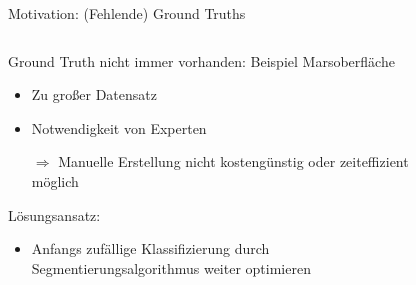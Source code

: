 \documentclass[9pt]{beamer}
\begin{document}
\begin{frame}{Motivation: (Fehlende) Ground Truths}
\begin{columns}
	\begin{column}{.7\textwidth}
		Ground Truth nicht immer vorhanden: Beispiel Marsoberfläche
		\begin{itemize}
			\item Zu großer Datensatz
			\item Notwendigkeit von Experten
			\item[$\Rightarrow$] Manuelle Erstellung nicht kostengünstig oder zeiteffizient möglich
		\end{itemize}
		\medskip
		Lösungsansatz:
		\begin{itemize}
			\item Anfangs zufällige Klassifizierung durch Segmentierungsalgorithmus weiter optimieren
		\end{itemize}
	\end{column}
	\begin{column}{.3\textwidth}
		\begin{figure}[H]

\end{figure}
\end{column}
\end{columns}
\end{frame}
\end{document}
